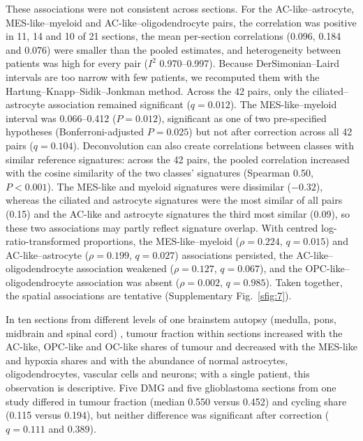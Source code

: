 \documentclass[11pt,a4paper]{article}
\begin{document}
These associations were not consistent across sections. For the AC-like--astrocyte, MES-like--myeloid and
AC-like--oligodendrocyte pairs, the correlation was positive in 11, 14 and 10 of 21 sections, the mean per-section
correlations (0.096, 0.184 and 0.076) were smaller than the pooled estimates, and heterogeneity between patients was high
for every pair ($I^2$ 0.970--0.997). Because DerSimonian--Laird intervals are too narrow with few patients, we recomputed
them with the Hartung--Knapp--Sidik--Jonkman method. Across the 42 pairs, only the ciliated--astrocyte association remained
significant ($q = 0.012$). The MES-like--myeloid interval was 0.066--0.412 ($P = 0.012$), significant as one of two
pre-specified hypotheses (Bonferroni-adjusted $P = 0.025$) but not after correction across all 42 pairs ($q = 0.104$).
Deconvolution can also create correlations between classes with similar reference signatures: across the 42 pairs, the
pooled correlation increased with the cosine similarity of the two classes' signatures (Spearman 0.50, $P < 0.001$). The
MES-like and myeloid signatures were dissimilar ($-0.32$), whereas the ciliated and astrocyte signatures were the most
similar of all pairs (0.15) and the AC-like and astrocyte signatures the third most similar (0.09), so these two
associations may partly reflect signature overlap. With centred log-ratio-transformed proportions, the MES-like--myeloid
($\rho = 0.224$, $q = 0.015$) and AC-like--astrocyte ($\rho = 0.199$, $q = 0.027$) associations persisted, the
AC-like--oligodendrocyte association weakened ($\rho = 0.127$, $q = 0.067$), and the OPC-like--oligodendrocyte association
was absent ($\rho = 0.002$, $q = 0.985$). Taken together, the spatial associations are tentative (Supplementary
Fig.~\ref{sfig:7}).

In ten sections from different levels of one brainstem autopsy (medulla, pons, midbrain and spinal cord)
\citep{kordowski2025spatial}, tumour fraction within sections increased with the AC-like, OPC-like and OC-like shares of
tumour and decreased with the MES-like and hypoxia shares and with the abundance of normal astrocytes, oligodendrocytes,
vascular cells and neurons; with a single patient, this observation is descriptive. Five DMG and five glioblastoma sections
from one study \citep{ren2023spatial} differed in tumour fraction (median 0.550 versus 0.452) and cycling share (0.115
versus 0.194), but neither difference was significant after correction ($q = 0.111$ and 0.389).
\end{document}
